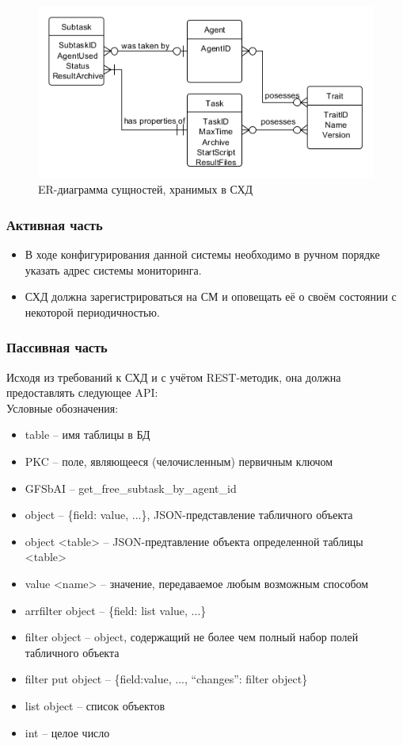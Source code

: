 \documentclass[a4paper,12pt]{report}
\numberwithin{equation}{section}
\begin{document}
\begin{figure}[h!]
  \centering
  \includegraphics[width=.9\linewidth]{diagrams/db/er}
  \caption{ER-диаграмма сущностей, хранимых в СХД}
  \label{fig:db-er}
\end{figure}

\subsubsection{Активная часть}
\begin{itemize}
  \item В ходе конфигурирования данной системы необходимо в ручном порядке указать адрес системы мониторинга.
  \item СХД должна зарегистрироваться на СМ и оповещать её о своём состоянии с некоторой периодичностью.
\end{itemize}

\subsubsection{Пассивная часть}
Исходя из требований к СХД и с учётом REST-методик, она должна предоставлять следующее API:
\\
Условные обозначения:
\begin{itemize}
  \item table -- имя таблицы в БД
  \item PKC -- поле, являющееся (челочисленным) первичным ключом
  \item GFSbAI -- get\_free\_subtask\_by\_agent\_id
  \item object -- \{field: value, ...\}, JSON-представление табличного объекта
  \item object <table> -- JSON-предтавление объекта определенной таблицы <table>
  \item value <name> -- значение, передаваемое любым возможным способом
  \item arrfilter object -- \{field: list value, ...\}
  \item filter object -- object, содержащий не более чем полный набор полей табличного объекта
  \item filter put object -- \{field:value, ..., ``changes'': filter object\}
  \item list object -- список объектов
  \item int -- целое число
\end{itemize}
\end{document}
